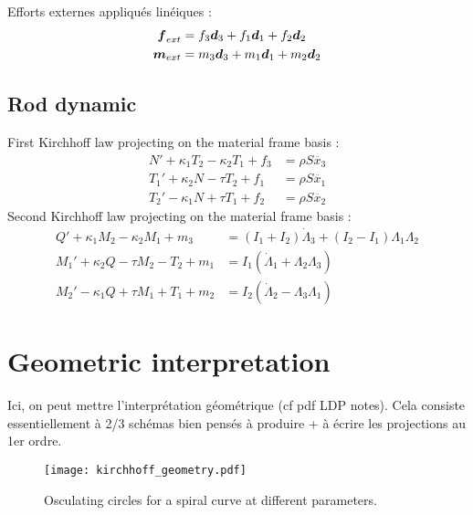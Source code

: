 Efforts externes appliqués linéiques :
\begin{subequations}
	\begin{align}
		\boldsymbol{f}_{ext} &= f_3\boldsymbol{d}_3 + f_1\boldsymbol{d}_1 + f_2\boldsymbol{d}_2
		\\
		\boldsymbol{m}_{ext} &= m_3\boldsymbol{d}_3 + m_1\boldsymbol{d}_1 + m_2\boldsymbol{d}_2
	\end{align}
\end{subequations}

\subsection{Rod dynamic}

First Kirchhoff law projecting on the material frame basis :
\begin{subequations}
	\begin{align}
		N' + \kappa_1 T_2 - \kappa_2 T_1 + f_3 &= \rho S \ddot{x_3}
		\\
		T_1' + \kappa_2 N - \tau T_2 + f_1 &= \rho S \ddot{x_1}
		\\
		T_2' - \kappa_1 N + \tau T_1 + f_2 &= \rho S \ddot{x_2}
	\end{align}
\end{subequations}
Second Kirchhoff law projecting on the material frame basis :
\begin{subequations}
	\begin{align}
		Q' + \kappa_1 M_2 - \kappa_2 M_1 + m_3 &= (I_1 + I_2)\dot{\Lambda}_3 + (I_2 - I_1)\Lambda_1\Lambda_2
		\label{eq:3_16_a}\\
		M_1' + \kappa_2 Q - \tau M_2 - T_2 + m_1 &= I_1 (\dot{\Lambda}_1 + \Lambda_2 \Lambda_3)
		\label{eq:3_16_b}\\
		M_2' - \kappa_1 Q + \tau M_1 + T_1 + m_2 &= I_2 (\dot{\Lambda}_2 - \Lambda_3 \Lambda_1)
		\label{eq:3_16_c}
	\end{align}
\end{subequations}

\section{Geometric interpretation}

Ici, on peut mettre l'interprétation géométrique (cf pdf LDP notes).
Cela consiste essentiellement à 2/3 schémas bien pensés à produire + à écrire les projections au 1er ordre.

\begin{figure}[t]
	\centering
	\texttt{[image: kirchhoff\_geometry.pdf]}
	\caption{Osculating circles for a spiral curve at different parameters.}
	\label{fig:5}
\end{figure}

